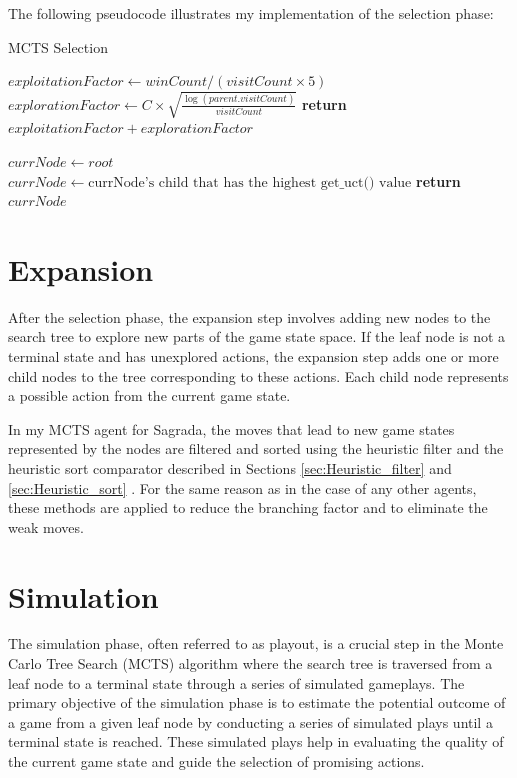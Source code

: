 The following pseudocode illustrates my implementation of the selection phase:

\begin{algorithm}[H]
    \caption{MCTS Selection}
    \begin{algorithmic}[1]
        \State $exploitationFactor \gets winCount / (visitCount \times 5)$
        \State $explorationFactor \gets C \times \sqrt{\frac{\log(parent.visitCount)}{visitCount}}$
        \State \textbf{return} $exploitationFactor + explorationFactor$
    \EndFunction
    
        \State $currNode \gets root$
            \State $currNode \gets \text{currNode's child that has the highest get\_uct() value}$
        \EndWhile
        \State \textbf{return} $currNode$
    \EndFunction
    \end{algorithmic}
\end{algorithm}


\section{Expansion}

After the selection phase, the expansion step involves adding new nodes to the search tree to explore new parts of the game state space.  If the leaf node is not a terminal state 
and has unexplored actions, the expansion step adds one or more child nodes to the tree corresponding to these actions. Each child node represents a possible action from the current game state.

In my MCTS agent for Sagrada, the moves that lead to new game states represented by the nodes are filtered and sorted using the heuristic filter and the heuristic sort comparator 
described in Sections \ref{sec:Heuristic_filter} and \ref{sec:Heuristic_sort} . For the same reason as in the case of any other agents, these methods are applied to reduce the 
branching factor and to eliminate the weak moves.

\section{Simulation}

The simulation phase, often referred to as playout, is a crucial step in the Monte Carlo Tree Search (MCTS) algorithm where the search tree is traversed from a leaf node to a 
terminal state through a series of simulated gameplays. The primary objective of the simulation phase is to estimate the potential outcome of a game from a given leaf node by 
conducting a series of simulated plays until a terminal state is reached. These simulated plays help in evaluating the quality of the current game state and guide the selection 
of promising actions.

